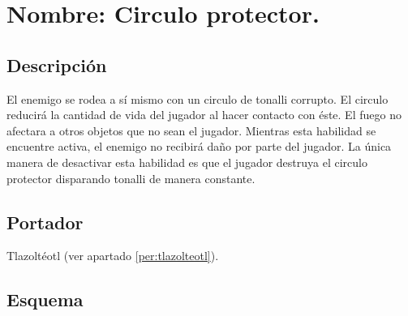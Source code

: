 \section{Nombre: Circulo protector.} \label{hab.CirPro}
\subsection{Descripción}
El enemigo se rodea a sí mismo con un circulo de tonalli corrupto. El circulo reducirá la cantidad de vida del jugador al hacer contacto con éste. El fuego no afectara a otros objetos que no sean el jugador. Mientras esta habilidad se encuentre activa, el enemigo no recibirá daño por parte del jugador. La única manera de desactivar esta habilidad es que el jugador destruya el circulo protector disparando tonalli de manera constante. 
\subsection{Portador}
Tlazoltéotl (ver apartado \ref{per:tlazolteotl}).
\subsection{Esquema}
			
